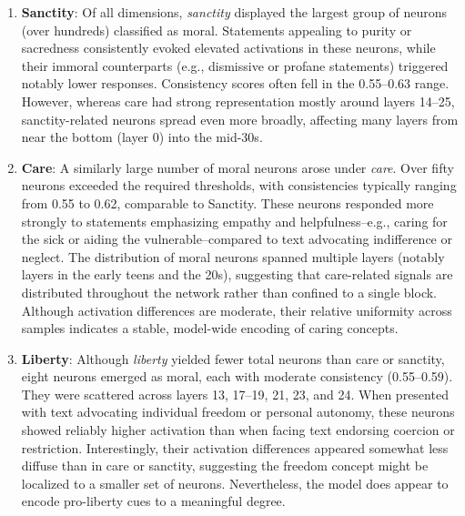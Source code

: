\documentclass[runninghheads]{llncs}
\begin{document}
\begin{enumerate}
    \item \textbf{Sanctity}: Of all dimensions, \textit{sanctity} displayed the largest group of neurons (over hundreds) classified as moral.  Statements appealing to purity or sacredness consistently evoked elevated activations in these neurons, while their immoral counterparts (e.g., dismissive or profane statements) triggered notably lower responses. Consistency scores often fell in the 0.55–0.63 range. However, whereas care had strong representation mostly around layers 14–25, sanctity-related neurons spread even more broadly, affecting many layers from near the bottom (layer 0) into the mid-30s. 


    \item \textbf{Care}: A similarly large number of moral neurons arose under \textit{care}. Over fifty neurons exceeded the required thresholds, with consistencies typically ranging from 0.55 to 0.62, comparable to Sanctity. These neurons responded more strongly to statements emphasizing empathy and helpfulness--e.g., caring for the sick or aiding the vulnerable--compared to text advocating indifference or neglect. The distribution of moral neurons spanned multiple layers (notably layers in the early teens and the 20s), suggesting that care-related signals are distributed throughout the network rather than confined to a single block. Although activation differences are moderate, their relative uniformity across samples indicates a stable, model-wide encoding of caring concepts.

    \item \textbf{Liberty}: Although \textit{liberty} yielded fewer total neurons than care or sanctity, eight neurons emerged as moral, each with moderate consistency (0.55–0.59). They were scattered across layers 13, 17–19, 21, 23, and 24. When presented with text advocating individual freedom or personal autonomy, these neurons showed reliably higher activation than when facing text endorsing coercion or restriction. Interestingly, their activation differences appeared somewhat less diffuse than in care or sanctity, suggesting the freedom concept might be localized to a smaller set of neurons. Nevertheless, the model does appear to encode pro-liberty cues to a meaningful degree.
\end{enumerate}

\end{document}

